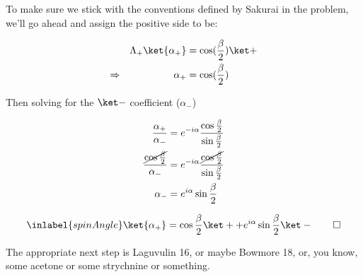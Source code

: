 \begin{answer}
  To make sure we stick with the conventions defined by Sakurai in the
  problem, we'll go ahead and assign the positive side to be:

  \begin{equation}
    \begin{alignedat}{2}
      & &
      \Lambda_+\ket{\alpha_+} &= \cos(\frac \beta 2)\ket +\\
      \Rightarrow \quad & &
      \alpha_+ &= \cos(\frac \beta 2)\\
    \end{alignedat}
  \end{equation}

  Then solving for the $\ket -$ coefficient ($\alpha_-$)

  \begin{equation}
    \begin{split}
      \frac{\alpha_+}{\alpha_-}
      &= e^{-i\alpha}\frac{\cos{\frac{\beta}{2}}}{\sin{\frac{\beta}{2}}}\\
      \frac{\cancel{\cos{\frac{\beta}{2}}}}{\alpha_-}
      &= e^{-i\alpha}
      \frac{\cancel{\cos{\frac{\beta}{2}}}}{\sin{\frac{\beta}{2}}}\\
      \alpha_- &= e^{i\alpha}\sin{\frac{\beta}{2}}\\
    \end{split}
  \end{equation}

  \begin{equation}
    \inlabel{spinAngle}
    \ket{\alpha_+} = \cos{\frac{\beta}{2}} \ket + + e^{i\alpha}\sin{\frac{\beta}{2}} \ket - \qed
  \end{equation}

  The appropriate next step is Laguvulin 16, or maybe Bowmore 18, or,
  you know, some acetone or some strychnine or something.

\end{answer}
